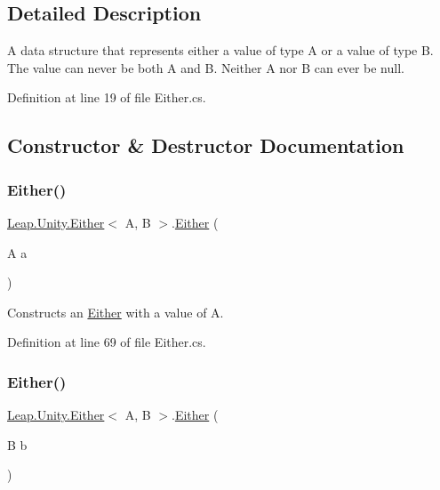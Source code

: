 \subsection{Detailed Description}
A data structure that represents either a value of type A or a value of type B. The value can never be both A and B. Neither A nor B can ever be null. 



Definition at line 19 of file Either.\+cs.



\subsection{Constructor \& Destructor Documentation}
\mbox{\label{struct_leap_1_1_unity_1_1_either_aff7e724eb9b602c97e27bba85b4e3aa1}} 
\subsubsection{\texorpdfstring{Either()}{Either()}\hspace{0.1cm}{\footnotesize\ttfamily [1/2]}}
{\footnotesize\ttfamily \mbox{\hyperlink{struct_leap_1_1_unity_1_1_either}{Leap.\+Unity.\+Either}}$<$ A, B $>$.\mbox{\hyperlink{struct_leap_1_1_unity_1_1_either}{Either}} (\begin{DoxyParamCaption}\item[{A}]{a }\end{DoxyParamCaption})}



Constructs an \mbox{\hyperlink{struct_leap_1_1_unity_1_1_either}{Either}} with a value of A. 



Definition at line 69 of file Either.\+cs.

\mbox{\label{struct_leap_1_1_unity_1_1_either_a42d1ab7f4e2bf0794752cc858affec7a}} 
\subsubsection{\texorpdfstring{Either()}{Either()}\hspace{0.1cm}{\footnotesize\ttfamily [2/2]}}
{\footnotesize\ttfamily \mbox{\hyperlink{struct_leap_1_1_unity_1_1_either}{Leap.\+Unity.\+Either}}$<$ A, B $>$.\mbox{\hyperlink{struct_leap_1_1_unity_1_1_either}{Either}} (\begin{DoxyParamCaption}\item[{B}]{b }\end{DoxyParamCaption})}



